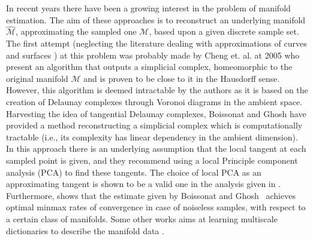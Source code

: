 \documentclass[12pt]{article}
\theoremstyle{remark}
\newcommand{\MM}{\mathcal{M}}
\begin{document}
In recent years there have been a growing interest in the problem of manifold estimation.
The aim of these approaches is to reconstruct an underlying manifold $\widehat{\MM}$, approximating the sampled one $\MM$, based upon a given discrete sample set.
The first attempt (neglecting the literature dealing with approximations of curves and surfaces \cite{dey2006curve,wendland2004scattered}) at this problem was probably made by Cheng et. al. at 2005 \cite{cheng2005manifold} who present an algorithm that outputs a simplicial complex, homeomorphic to the original manifold $\MM$ and is proven to be close to it in the Hausdorff sense.
However, this algorithm is deemed intractable by the authors as it is based on the creation of Delaunay complexes through Voronoi diagrams in the ambient space. 
Harvesting the idea of tangential Delaunay complexes, Boissonat and Ghosh \cite{boissonnat2014manifold} have provided a method reconstructing a simplicial complex which is computationally tractable (i.e., its complexity has linear dependency in the ambient dimension).
In this approach there is an underlying assumption that the local tangent at each sampled point is given, and they recommend using a local Principle component analysis (PCA) to find these tangents.
The choice of local PCA as an approximating tangent is shown to be a valid one in the analysis given in \cite{aamari2018stability,kaslovsky2011optimal,kaslovsky2014non,singer2012vector}. Furthermore, \cite{aamari2018stability} shows that the estimate given by Boissonat and Ghosh~\cite{boissonnat2014manifold} achieves optimal minmax rates of convergence in case of noiseless samples, with respect to a certain class of manifolds.
Some other works aims at learning multiscale dictionaries to describe the manifold data \cite{allard2012multi}. 
\end{document}
